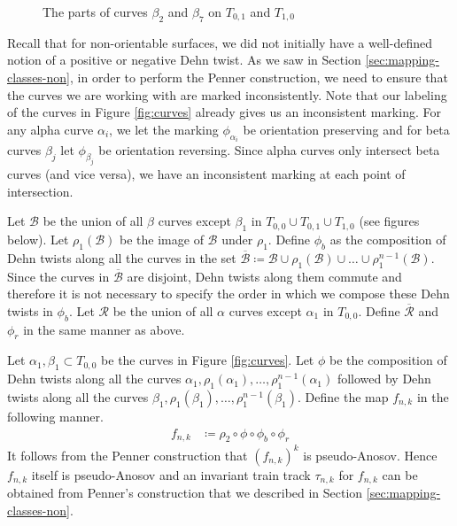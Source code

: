 \begin{figure}[h]
    \centering
    \caption{The parts of curves $\beta_2$ and $\beta_7$ on $T_{0,1}$ and $T_{1,0}$}
    \label{fig:extracurves}
\end{figure}

Recall that for non-orientable surfaces, we did not initially have a well-defined notion of a positive or
negative Dehn twist. As we saw in Section \ref{sec:mapping-classes-non}, in order to perform the Penner
construction, we need to ensure that the curves we are working with are marked inconsistently. Note that our
labeling of the curves in Figure \ref{fig:curves} already gives us an inconsistent marking. For any alpha curve $\alpha_i$, we let the
marking $\phi_{\alpha_i}$ be orientation preserving and for beta curves $\beta_j$ let $\phi_{\beta_j}$ be
orientation reversing. Since alpha curves only intersect beta curves (and vice versa), we have an inconsistent
marking at each point of intersection.

Let $\mathcal{B}$ be the union of all $\beta$ curves except $\beta_1$ in $T_{0,0} \cup T_{0,1} \cup T_{1,0}$
(see figures below). Let $\rho_1(\mathcal{B})$ be the image of $\mathcal{B}$ under $\rho_1$. Define $\phi_b$
as the composition of Dehn twists along all the curves in the set
$\overline{\mathcal{B}} \coloneqq \mathcal{B} \cup \rho_1(\mathcal{B}) \cup \dots \cup
\rho_1^{n-1}(\mathcal{B})$. Since the curves in $\overline{\mathcal{B}}$ are disjoint, Dehn twists along them
commute and therefore it is not necessary to specify the order in which we compose these Dehn twists in
$\phi_b$. Let $\mathcal{R}$ be the union of all $\alpha$ curves except $\alpha_1$ in $T_{0,0}$. Define
$\overline{\mathcal{R}}$ and $\phi_r$ in the same manner as above.

Let $\alpha_1,\beta_1 \subset T_{0,0}$ be the curves in Figure \ref{fig:curves}. Let $\phi$ be the composition
of Dehn twists along all the curves $\alpha_1, \rho_1(\alpha_1), \dots, \rho_1^{n-1}(\alpha_1)$ followed by
Dehn twists along all the curves $\beta_1,\rho_1(\beta_1),\dots,\rho_1^{n-1}(\beta_1)$. Define the map $f_{n,k}$
in the following manner.
\begin{align*}
    f_{n,k} &\coloneqq \rho_2 \circ \phi \circ \phi_b \circ \phi_r
\end{align*}
It follows from the Penner construction that $(f_{n,k})^k$ is pseudo-Anosov. Hence $f_{n,k}$ itself is
pseudo-Anosov and an invariant train track $\tau_{n,k}$ for $f_{n,k}$ can be obtained from Penner's
construction that we described in Section \ref{sec:mapping-classes-non}.

